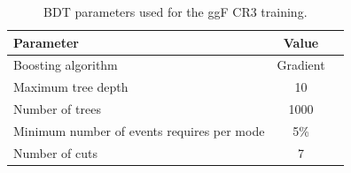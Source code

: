 \begin{table}[h!]
\centering
\begin{tabular}{|l|c|c|}
\hline
Parameter                                    & Value     \\
\hline
Boosting algorithm                           & Gradient \\
Maximum tree depth                           &  10      \\
Number of trees                              &  1000    \\
Minimum number of events requires per mode   &  5\%     \\ 
Number of cuts                               &  7       \\
\hline
\end{tabular}
\caption{BDT parameters used for the ggF CR3 training.}
\label{tab:ggFCR3BDTparameters}
\end{table}

